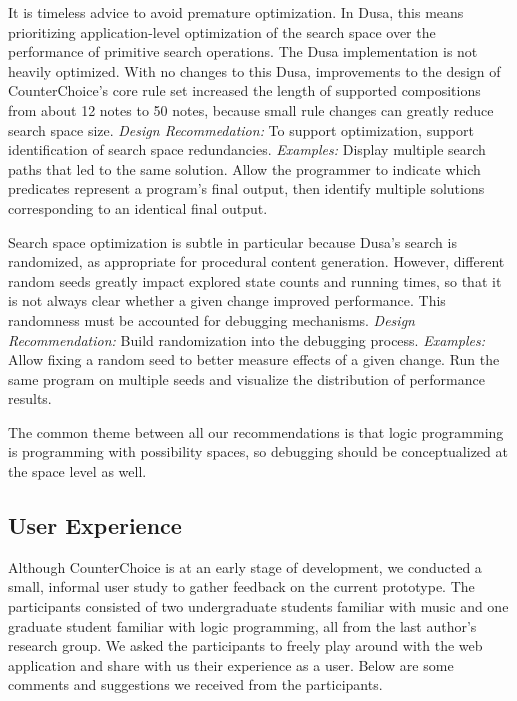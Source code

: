 It is timeless advice to avoid premature optimization.
In Dusa, this means prioritizing application-level optimization of the search space over the performance of primitive search operations.
The Dusa implementation is not heavily optimized.
With no changes to this Dusa, improvements to the design of CounterChoice's core rule set increased the length of supported compositions 
from about 12 notes to 50 notes, because  small rule changes can greatly reduce search space size.
\emph{Design Recommedation:} To support optimization, support identification of search space redundancies.
\emph{Examples:} Display multiple search paths that led to the same solution. Allow the programmer to indicate which predicates represent a program's final output, then identify multiple solutions corresponding to an identical final output.

Search space optimization is subtle in particular because Dusa's search is randomized, as appropriate for procedural content generation.
However, different random seeds greatly impact explored state counts and running times, so that it is not always clear whether a given change improved performance.
This randomness must be accounted for debugging mechanisms.
\emph{Design Recommendation:} Build randomization into the debugging process.
\emph{Examples:} Allow fixing a random seed to better measure effects of a given change. Run the same program on multiple seeds and visualize the distribution of performance results.

The common theme between all our recommendations is that logic programming is programming with possibility spaces, so debugging should be conceptualized at the space level as well.

\subsection{User Experience}
Although CounterChoice is at an early stage of development, we conducted a small,
informal user study to gather feedback on the current prototype.
The participants consisted of two undergraduate students familiar with music and
one graduate student familiar with logic programming, all from the last author's
research group.
We asked the participants to freely play around with the web application and
share with us their experience as a user.
Below are some comments and suggestions we received from the participants.

